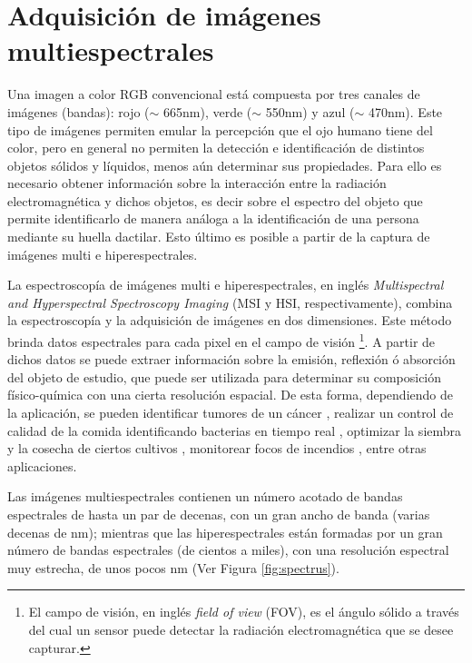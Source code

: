 \singlespacing
\section{Adquisición de imágenes multiespectrales}
\label{sec:motivacion}


\hspace{0.5cm}Una imagen a color RGB convencional está compuesta por tres 
canales de 
imágenes (bandas): rojo 
($\sim$ 665nm), verde ($\sim$ 550nm) y azul ($\sim$ 470nm). Este tipo de 
imágenes permiten emular la percepción que el ojo humano tiene del color, pero 
en general no permiten la detección e identificación de distintos objetos 
sólidos y 
líquidos, menos 
aún determinar sus propiedades. Para ello 
es necesario obtener información sobre la interacción entre la radiación electromagnética y dichos objetos, es decir sobre el espectro del objeto que permite identificarlo de manera análoga a la identificación de una persona mediante su huella dactilar. Esto último es posible a partir de la captura de imágenes multi e hiperespectrales.

La espectroscopía de imágenes multi e hiperespectrales, en inglés \textit{Multispectral and Hyperspectral Spectroscopy
Imaging} (MSI y HSI, respectivamente), combina la espectroscopía y la adquisición de imágenes en dos dimensiones.
Este método brinda datos espectrales para cada pixel en el campo de visión \footnote{El campo de visión, en inglés \textit{field of view} (FOV), es el ángulo sólido a través del cual un sensor puede
detectar la radiación electromagnética que se desee capturar.}. A partir de
dichos datos se puede extraer información sobre la emisión, reflexión ó absorción del objeto de estudio, que puede ser utilizada para determinar su composición físico-química con una cierta
resolución espacial. De esta forma, dependiendo de la aplicación, se pueden identificar tumores de un cáncer \cite{canc}, realizar un
control de calidad de la comida identificando bacterias en tiempo real \cite{food}, optimizar la siembra y la cosecha de ciertos cultivos \cite{cultiv}, monitorear focos de incendios \cite{fire}, entre otras
aplicaciones.

Las imágenes multiespectrales contienen un número acotado de bandas espectrales 
de hasta un par de decenas, con un gran ancho de banda (varias decenas de nm); 
mientras que las hiperespectrales están formadas por un gran número de bandas 
espectrales (de cientos a miles), con una resolución espectral muy estrecha, de 
unos pocos nm (Ver Figura \ref{fig:spectrus}).


